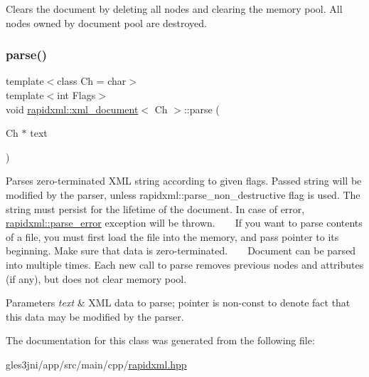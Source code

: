 Clears the document by deleting all nodes and clearing the memory pool. All nodes owned by document pool are destroyed. \mbox{\label{classrapidxml_1_1xml__document_ac6e73ff9ac323bf5a370c38feb03a6b1}} 
\subsubsection{\texorpdfstring{parse()}{parse()}}
{\footnotesize\ttfamily template$<$class Ch  = char$>$ \\
template$<$int Flags$>$ \\
void \hyperlink{classrapidxml_1_1xml__document}{rapidxml\+::xml\+\_\+document}$<$ Ch $>$\+::parse (\begin{DoxyParamCaption}\item[{Ch $\ast$}]{text }\end{DoxyParamCaption})\hspace{0.3cm}{\ttfamily [inline]}}

Parses zero-\/terminated X\+ML string according to given flags. Passed string will be modified by the parser, unless rapidxml\+::parse\+\_\+non\+\_\+destructive flag is used. The string must persist for the lifetime of the document. In case of error, \hyperlink{classrapidxml_1_1parse__error}{rapidxml\+::parse\+\_\+error} exception will be thrown. ~\newline
~\newline
 If you want to parse contents of a file, you must first load the file into the memory, and pass pointer to its beginning. Make sure that data is zero-\/terminated. ~\newline
~\newline
 Document can be parsed into multiple times. Each new call to parse removes previous nodes and attributes (if any), but does not clear memory pool. 
\begin{DoxyParams}{Parameters}
{\em text} & X\+ML data to parse; pointer is non-\/const to denote fact that this data may be modified by the parser. \\
\hline
\end{DoxyParams}


The documentation for this class was generated from the following file\+:\begin{DoxyCompactItemize}
\item 
gles3jni/app/src/main/cpp/\hyperlink{rapidxml_8hpp}{rapidxml.\+hpp}\end{DoxyCompactItemize}
